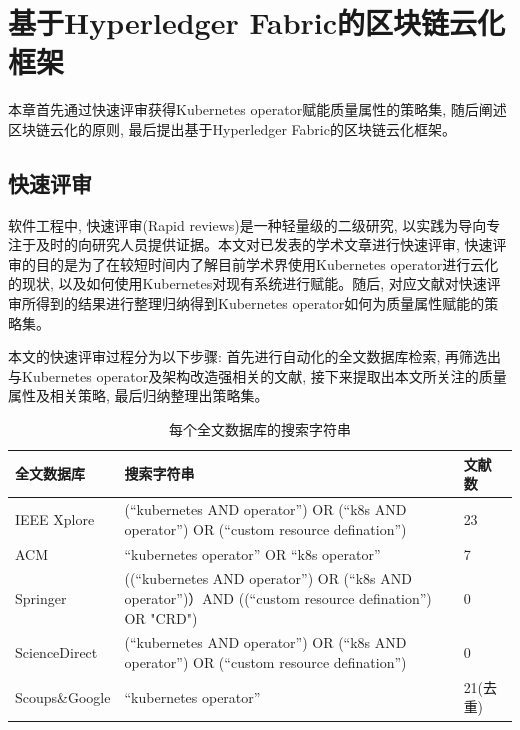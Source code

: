 \chapter{基于Hyperledger Fabric的区块链云化框架}

本章首先通过快速评审获得Kubernetes operator赋能质量属性的策略集,  随后阐述区块链云化的原则, 最后提出基于Hyperledger Fabric的区块链云化框架。

\section{快速评审}\label{section: rapid_reviews}

软件工程中, 快速评审(Rapid reviews)是一种轻量级的二级研究, 以实践为导向专注于及时的向研究人员提供证据\cite{cartaxo2020rapid}。本文对已发表的学术文章进行快速评审, 快速评审的目的是为了在较短时间内了解目前学术界使用Kubernetes operator进行云化的现状, 以及如何使用Kubernetes对现有系统进行赋能。随后, 对应文献对快速评审所得到的结果进行整理归纳得到Kubernetes operator如何为质量属性赋能的策略集。

本文的快速评审过程分为以下步骤: 首先进行自动化的全文数据库检索, 再筛选出与Kubernetes operator及架构改造强相关的文献, 接下来提取出本文所关注的质量属性及相关策略, 最后归纳整理出策略集。

{\footnotesize
\begin{longtable}[h]{m{60pt} m{210pt} m{40pt}<{\centering}}
    \caption[每个全文数据库的搜索字符串]{每个全文数据库的搜索字符串} \label{search_string} \\
        \toprule  
        \textbf{全文数据库}&\textbf{搜索字符串}&\textbf{文献数}\\
        \hline
        IEEE Xplore &(“kubernetes AND operator”) OR (“k8s AND operator”) OR (“custom resource defination”) & 23 \\

        ACM & “kubernetes operator” OR “k8s operator” & 7 \\

        Springer &((“kubernetes AND operator”) OR (“k8s AND operator”)）AND ((“custom resource defination”) OR "CRD") & 0 \\

        ScienceDirect &(“kubernetes AND operator”) OR (“k8s AND operator”) OR (“custom resource defination”) & 0 \\
        \hline
        Scoups\&Google &“kubernetes operator”& 21(去重) \\
        \bottomrule
    \end{longtable}
}

